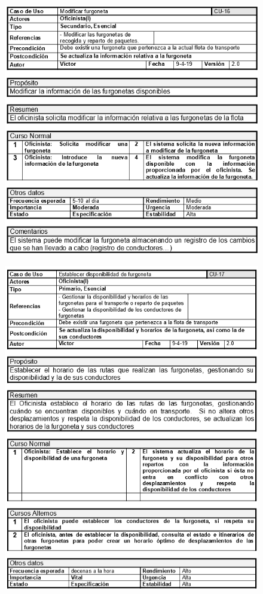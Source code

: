 \begin{figure}[H]
	\centering
	\includegraphics[width=16cm]{16}
\end{figure}
\begin{figure}[H]
	\centering
	\includegraphics[width=16cm]{17}
\end{figure}
